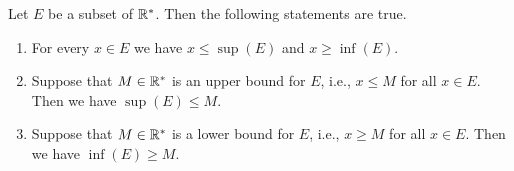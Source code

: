 \begin{thm}\label{i:6.2.11}
  Let \(E\) be a subset of \(\mathbb{R}^*\).
  Then the following statements are true.
  \begin{enumerate}
    \item\label{i:6.2.11.a} For every \(x \in E\) we have \(x \leq \sup(E)\) and \(x \geq \inf(E)\).
    \item\label{i:6.2.11.b} Suppose that \(M \in \mathbb{R}^*\) is an upper bound for \(E\), i.e., \(x \leq M\) for all \(x \in E\).
    Then we have \(\sup(E) \leq M\).
    \item\label{i:6.2.11.c} Suppose that \(M \in \mathbb{R}^*\) is a lower bound for \(E\), i.e., \(x \geq M\) for all \(x \in E\).
    Then we have \(\inf(E) \geq M\).
  \end{enumerate}
\end{thm}

